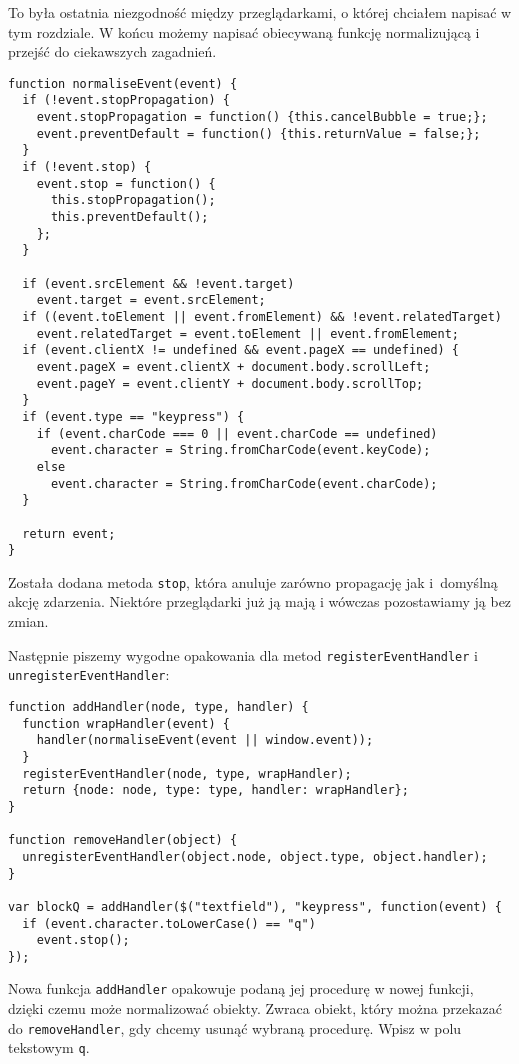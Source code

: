   
To była ostatnia niezgodność między przeglądarkami, o której chciałem napisać w tym rozdziale. W końcu możemy napisać obiecywaną funkcję normalizującą i przejść do ciekawszych zagadnień.

  
\begin{verbatim} 
function normaliseEvent(event) {
  if (!event.stopPropagation) {
    event.stopPropagation = function() {this.cancelBubble = true;};
    event.preventDefault = function() {this.returnValue = false;};
  }
  if (!event.stop) {
    event.stop = function() {
      this.stopPropagation();
      this.preventDefault();
    };
  }

  if (event.srcElement && !event.target)
    event.target = event.srcElement;
  if ((event.toElement || event.fromElement) && !event.relatedTarget)
    event.relatedTarget = event.toElement || event.fromElement;
  if (event.clientX != undefined && event.pageX == undefined) {
    event.pageX = event.clientX + document.body.scrollLeft;
    event.pageY = event.clientY + document.body.scrollTop;
  }
  if (event.type == "keypress") {
    if (event.charCode === 0 || event.charCode == undefined)
      event.character = String.fromCharCode(event.keyCode);
    else
      event.character = String.fromCharCode(event.charCode);
  }

  return event;
}
\end{verbatim}
  
Została dodana metoda \texttt{stop}, która anuluje zarówno propagację jak i~domyślną akcję zdarzenia. Niektóre przeglądarki już ją mają i wówczas pozostawiamy ją bez zmian.

  
Następnie piszemy wygodne opakowania dla metod \texttt{registerEventHandler} i \texttt{unregisterEventHandler}:

  
\begin{verbatim} 
function addHandler(node, type, handler) {
  function wrapHandler(event) {
    handler(normaliseEvent(event || window.event));
  }
  registerEventHandler(node, type, wrapHandler);
  return {node: node, type: type, handler: wrapHandler};
}

function removeHandler(object) {
  unregisterEventHandler(object.node, object.type, object.handler);
}

var blockQ = addHandler($("textfield"), "keypress", function(event) {
  if (event.character.toLowerCase() == "q")
    event.stop();
});
\end{verbatim}
  
Nowa funkcja \texttt{addHandler} opakowuje podaną jej procedurę w nowej funkcji, dzięki czemu może normalizować obiekty. Zwraca obiekt, który można przekazać do \texttt{removeHandler}, gdy chcemy usunąć wybraną procedurę. Wpisz w polu tekstowym \texttt{q}.

